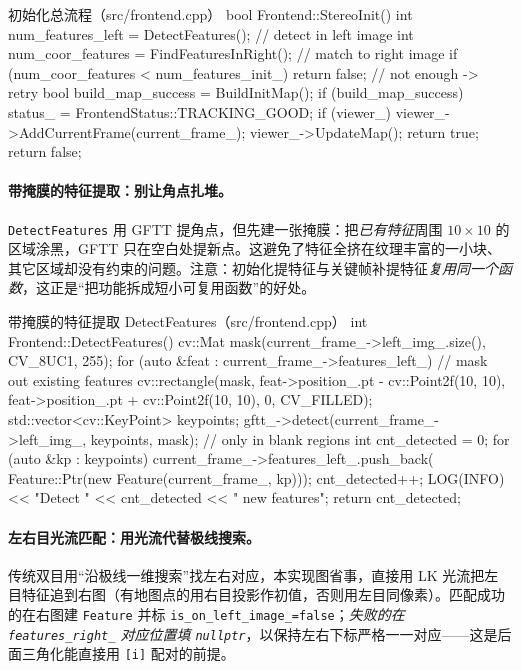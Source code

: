 \begin{codebox}[C++]{初始化总流程（src/frontend.cpp）}
bool Frontend::StereoInit() {
    int num_features_left = DetectFeatures();        // detect in left image
    int num_coor_features = FindFeaturesInRight();   // match to right image
    if (num_coor_features < num_features_init_) return false;   // not enough -> retry
    bool build_map_success = BuildInitMap();
    if (build_map_success) {
        status_ = FrontendStatus::TRACKING_GOOD;
        if (viewer_) { viewer_->AddCurrentFrame(current_frame_); viewer_->UpdateMap(); }
        return true;
    }
    return false;
}
\end{codebox}

\paragraph{带掩膜的特征提取：别让角点扎堆。}
\texttt{DetectFeatures} 用 GFTT 提角点，但先建一张掩膜：把\emph{已有特征}周围 $10\times10$ 的区域涂黑，GFTT 只在空白处提新点。这避免了特征全挤在纹理丰富的一小块、其它区域却没有约束的问题。注意：初始化提特征与关键帧补提特征\emph{复用同一个函数}，这正是“把功能拆成短小可复用函数”的好处。

\begin{codebox}[C++]{带掩膜的特征提取 DetectFeatures（src/frontend.cpp）}
int Frontend::DetectFeatures() {
    cv::Mat mask(current_frame_->left_img_.size(), CV_8UC1, 255);
    for (auto &feat : current_frame_->features_left_) {      // mask out existing features
        cv::rectangle(mask, feat->position_.pt - cv::Point2f(10, 10),
                      feat->position_.pt + cv::Point2f(10, 10), 0, CV_FILLED);
    }
    std::vector<cv::KeyPoint> keypoints;
    gftt_->detect(current_frame_->left_img_, keypoints, mask);  // only in blank regions
    int cnt_detected = 0;
    for (auto &kp : keypoints) {
        current_frame_->features_left_.push_back(
            Feature::Ptr(new Feature(current_frame_, kp)));
        cnt_detected++;
    }
    LOG(INFO) << "Detect " << cnt_detected << " new features";
    return cnt_detected;
}
\end{codebox}

\paragraph{左右目光流匹配：用光流代替极线搜索。}
传统双目用“沿极线一维搜索”找左右对应，本实现图省事，直接用 LK 光流把左目特征追到右图（有地图点的用右目投影作初值，否则用左目同像素）。匹配成功的在右图建 \texttt{Feature} 并标 \verb|is_on_left_image_=false|；\emph{失败的在 \texttt{features\_right\_} 对应位置填 \texttt{nullptr}}，以保持左右下标严格一一对应——这是后面三角化能直接用 \texttt{[i]} 配对的前提。

